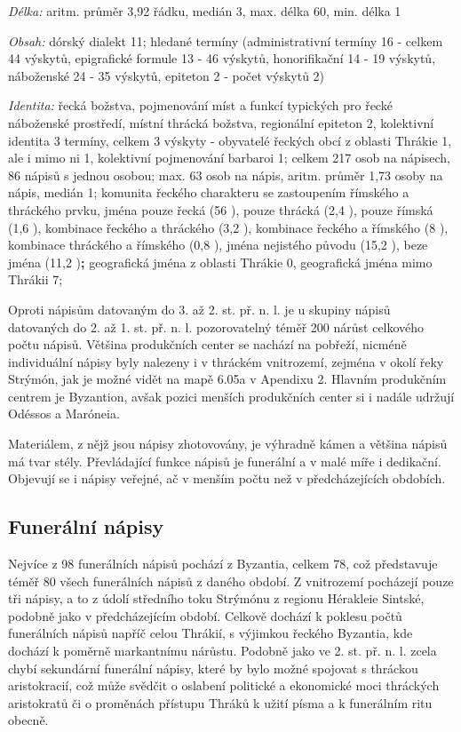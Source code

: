 {\em Délka:} aritm. průměr 3,92 řádku, medián 3, max. délka 60, min. délka 1

{\em Obsah:} dórský dialekt 11; hledané termíny (administrativní termíny 16 - celkem 44 výskytů, epigrafické formule 13 - 46 výskytů, honorifikační 14 - 19 výskytů, náboženské 24 - 35 výskytů, epiteton 2 - počet výskytů 2)

{\em Identita:} řecká božstva, pojmenování míst a funkcí typických pro řecké náboženské prostředí, místní thrácká božstva, regionální epiteton 2, kolektivní identita 3 termíny, celkem 3 výskyty - obyvatelé řeckých obcí z oblasti Thrákie 1, ale i mimo ni 1, kolektivní pojmenování barbaroi 1; celkem 217 osob na nápisech, 86 nápisů s jednou osobou; max. 63 osob na nápis, aritm. průměr 1,73 osoby na nápis, medián 1; komunita řeckého charakteru se zastoupením římského a thráckého prvku, jména pouze řecká (56 ), pouze thrácká (2,4 ), pouze římská (1,6 ), kombinace řeckého a thráckého (3,2 ), kombinace řeckého a římského (8 ), kombinace thráckého a římského (0,8 ), jména nejistého původu (15,2 ), beze jména (11,2 ){\bf ;} geografická jména z oblasti Thrákie 0, geografická jména mimo Thrákii 7;

\NC\AR
\HL
\HL
\stoptable

Oproti nápisům datovaným do 3. až 2. st. př. n. l. je u skupiny nápisů datovaných do 2. až 1. st. př. n. l. pozorovatelný téměř 200  nárůst celkového počtu nápisů. Většina produkčních center se nachází na pobřeží, nicméně individuální nápisy byly nalezeny i v thráckém vnitrozemí, zejména v okolí řeky Strýmón, jak je možné vidět na mapě 6.05a v Apendixu 2. Hlavním produkčním centrem je Byzantion, avšak pozici menších produkčních center si i nadále udržují Odéssos a Maróneia.

Materiálem, z nějž jsou nápisy zhotovovány, je výhradně kámen a většina nápisů má tvar stély. Převládající funkce nápisů je funerální a v malé míře i dedikační. Objevují se i nápisy veřejné, ač v menším počtu než v předcházejících obdobích.

\subsection[funerální-nápisy-8]{Funerální nápisy}

Nejvíce z 98 funerálních nápisů pochází z Byzantia, celkem 78, což představuje téměř 80  všech funerálních nápisů z daného období. Z vnitrozemí pocházejí pouze tři nápisy, a to z údolí středního toku Strýmónu z regionu Hérakleie Sintské, podobně jako v předcházejícím období. Celkově dochází k poklesu počtů funerálních nápisů napříč celou Thrákií, s výjimkou řeckého Byzantia, kde dochází k poměrně markantnímu nárůstu. Podobně jako ve 2. st. př. n. l. zcela chybí sekundární funerální nápisy, které by bylo možné spojovat s thráckou aristokracií, což může svědčit o oslabení politické a ekonomické moci thráckých aristokratů či o proměnách přístupu Thráků k užití písma a k funerálním ritu obecně.


